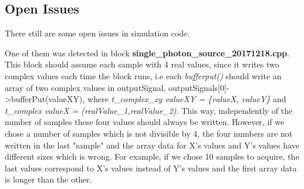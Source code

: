 \subsection{Open Issues}

There still are some open issues in simulation code.

One of them was detected in block \textbf{single\_photon\_source\_20171218.cpp}. This block should assume each sample with 4 real values, since it writes two complex values each time the block runs, i.e each \textit{bufferput()} should write an array of two complex values in outputSignal, outputSignals[0]->bufferPut(valueXY), where \textit{t\_complex\_xy valueXY = \{valueX, valueY\}} and \textit{t\_complex valueX = (realValue\_1,realValue\_2)}. This way, independently of the number of samples these four values should always be written. However, if we chose a number of samples which is not divisible by 4, the four numbers are not written in the last "sample" and the array data for X's values and Y's values have different sizes which is wrong. For example, if we chose 10 samples to acquire, the last values correspond to X's values instead of Y's values and the first array data is longer than the other. 
